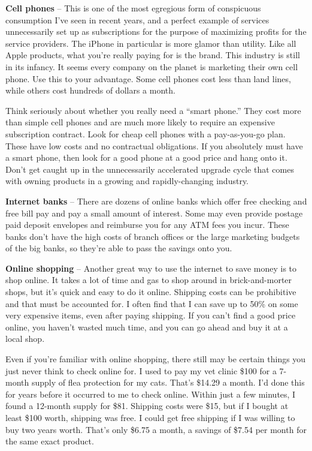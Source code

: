 \textbf{Cell phones} -- This is one of the most egregious form of conspicuous consumption I've seen in recent years, and a perfect example of services unnecessarily set up as subscriptions for the purpose of maximizing profits for the service providers. The iPhone in particular is more glamor than utility. Like all Apple products, what you're really paying for is the brand. This industry is still in its infancy. It seems every company on the planet is marketing their own cell phone. Use this to your advantage. Some cell phones cost less than land lines, while others cost hundreds of dollars a month.

Think seriously about whether you really need a ``smart phone.'' They cost more than simple cell phones and are much more likely to require an expensive subscription contract. Look for cheap cell phones with a pay-as-you-go plan. These have low costs and no contractual obligations. If you absolutely must have a smart phone, then look for a good phone at a good price and hang onto it. Don't get caught up in the unnecessarily accelerated upgrade cycle that comes with owning products in a growing and rapidly-changing industry.

\textbf{Internet banks} -- There are dozens of online banks which offer free checking and free bill pay and pay a small amount of interest. Some may even provide postage paid deposit envelopes and reimburse you for any ATM fees you incur. These banks don't have the high costs of branch offices or the large marketing budgets of the big banks, so they're able to pass the savings onto you.

\textbf{Online shopping} -- Another great way to use the internet to save money is to shop online. It takes a lot of time and gas to shop around in brick-and-morter shops, but it's quick and easy to do it online. Shipping costs can be prohibitive and that must be accounted for. I often find that I can save up to 50\% on some very expensive items, even after paying shipping. If you can't find a good price online, you haven't wasted much time, and you can go ahead and buy it at a local shop.

Even if you're familiar with online shopping, there still may be certain things you just never think to check online for. I used to pay my vet clinic \$100 for a 7-month supply of flea protection for my cats. That's \$14.29 a month. I'd done this for years before it occurred to me to check online. Within just a few minutes, I found a 12-month supply for \$81. Shipping costs were \$15, but if I bought at least \$100 worth, shipping was free. I could get free shipping if I was willing to buy two years worth. That's only \$6.75 a month, a savings of \$7.54 per month for the same exact product.

